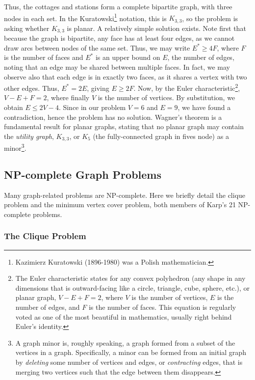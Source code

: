 \documentclass[11pt]{amsart}
\begin{document}
Thus, the cottages and stations form a complete bipartite graph, with three nodes in each set. In the Kuratowski\footnote{Kazimierz Kuratowski (1896-1980) was a Polish mathematician.} notation, this is $K_{3, 3}$, so the problem is asking whether $K_{3, 3}$ is planar. A relatively simple solution exists. Note first that because the graph is bipartite, any face has at least four edges, as we cannot draw arcs between nodes of the same set. Thus, we may write $E^{*} \geq 4F$, where $F$ is the number of faces and $E^{*}$ is an upper bound on $E$, the number of edges, noting that an edge may be shared between multiple faces. In fact, we may observe also that each edge is in exactly two faces, as it shares a vertex with two other edges. Thus, $E^{*} = 2E$, giving $E \geq 2F$. Now, by the Euler characteristic\footnote{The Euler characteristic states for any convex polyhedron (any shape in any dimensions that is outward-facing like a circle, triangle, cube, sphere, etc.), or planar graph, $V - E + F = 2$, where $V$ is the number of vertices, $E$ is the number of edges, and $F$ is the number of faces. This equation is regularly voted as one of the most beautiful in mathematics, usually right behind Euler's identity.}, $V - E + F = 2$, where finally $V$ is the number of vertices. By substitution, we obtain $E \leq 2V - 4$. Since in our problem $V = 6$ and $E = 9$, we have found a contradiction, hence the problem has no solution. Wagner's theorem is a fundamental result for planar graphs, stating that no planar graph may contain the \emph{utility graph}, $K_{3,3}$, or $K_5$ (the fully-connected graph in fives node) as a minor\footnote{A graph minor is, roughly speaking, a graph formed from a subset of the vertices in a graph. Specifically, a minor can be formed from an initial graph by \emph{deleting} some number of vertices and edges, or \emph{contracting} edges, that is merging two vertices such that the edge between them disappears.}.

\subsection{NP-complete Graph Problems}

Many graph-related problems are NP-complete. Here we briefly detail the clique problem and the minimum vertex cover problem, both members of Karp's 21 NP-complete problems.

\subsubsection{The Clique Problem}
\end{document}
